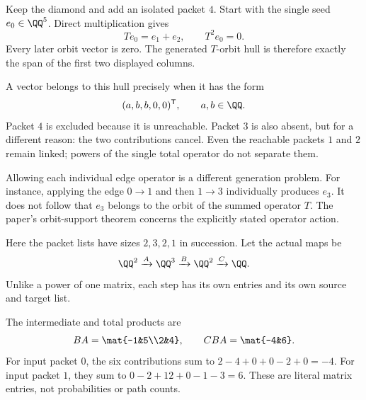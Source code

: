 Keep the diamond and add an isolated packet $4$. Start with the single seed $e_0\in\QQ^5$. Direct multiplication gives
\[
Te_0=e_1+e_2,\qquad T^2e_0=0.
\]
Every later orbit vector is zero. The generated $T$-orbit hull is therefore exactly the span of the first two displayed columns.


A vector belongs to this hull precisely when it has the form
\[
(a,b,b,0,0)^\mathsf T,\qquad a,b\in\QQ.
\]
Packet $4$ is excluded because it is unreachable. Packet $3$ is also absent, but for a different reason: the two contributions cancel. Even the reachable packets $1$ and $2$ remain linked; powers of the single total operator do not separate them.

Allowing each individual edge operator is a different generation problem. For instance, applying the edge $0\to1$ and then $1\to3$ individually produces $e_3$. It does not follow that $e_3$ belongs to the orbit of the summed operator $T$. The paper's orbit-support theorem concerns the explicitly stated operator action.


Here the packet lists have sizes $2,3,2,1$ in succession. Let the actual maps be
\[
\QQ^2\xrightarrow{A}\QQ^3\xrightarrow{B}\QQ^2\xrightarrow{C}\QQ.
\]
Unlike a power of one matrix, each step has its own entries and its own source and target list.


The intermediate and total products are
\[
BA=\mat{-1&5\\2&4},\qquad CBA=\mat{-4&6}.
\]
For input packet $0$, the six contributions sum to $2-4+0+0-2+0=-4$. For input packet $1$, they sum to $0-2+12+0-1-3=6$. These are literal matrix entries, not probabilities or path counts.

